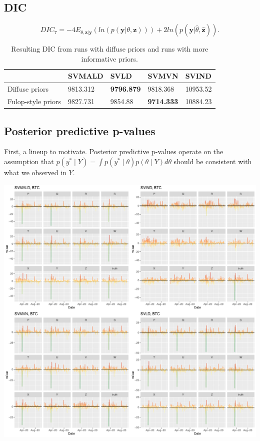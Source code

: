 \documentclass{article}\usepackage[]{graphicx}\usepackage[]{color}
\begin{document}
\clearpage
\newpage

\subsection{DIC}
 $$DIC_7 = -4E_{\theta,\boldsymbol{z} | \boldsymbol{y}}(ln(p(\boldsymbol{y}|\theta,\boldsymbol{z}))) + 2ln(p(\boldsymbol{y}|\hat{\theta}, \hat{\boldsymbol{z}})).$$ 
 
\begin{table}[]
\begin{tabular}{|l|l|l|l|l|}
\hline
                   & SVMALD  & SVLD    & SVMVN   & SVIND \\ \hline
Diffuse priors     &9813.312 &\textbf{9796.879} &9818.368 &10953.52 \\ \hline
Fulop-style priors &9827.731 &9854.88 &\textbf{9714.333} &10884.23 \\ \hline
\end{tabular}
\caption{\label{tab:dic7} Resulting DIC from runs with diffuse priors and runs with more informative priors. }
\end{table}
 

\subsection{Posterior predictive p-values}

First, a lineup to motivate. Posterior predictive p-values operate on the assumption that $p(y^* \mid Y) = \int p(y^* \mid \theta)p(\theta \mid Y) d \theta$ should be consistent with what we observed in $Y$.

\includegraphics[width = .9\linewidth]{"lineup_BTC.pdf"}
\end{document}
